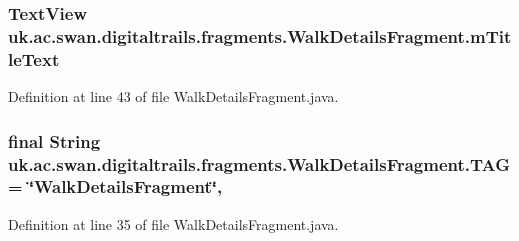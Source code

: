 \hypertarget{classuk_1_1ac_1_1swan_1_1digitaltrails_1_1fragments_1_1_walk_details_fragment_a9413fe91d82c12dd82f7d09040e6363e}{
\subsubsection[{m\+Title\+Text}]{\setlength{\rightskip}{0pt plus 5cm}Text\+View uk.\+ac.\+swan.\+digitaltrails.\+fragments.\+Walk\+Details\+Fragment.\+m\+Title\+Text\hspace{0.3cm}{\ttfamily [protected]}}}\label{classuk_1_1ac_1_1swan_1_1digitaltrails_1_1fragments_1_1_walk_details_fragment_a9413fe91d82c12dd82f7d09040e6363e}


Definition at line 43 of file Walk\+Details\+Fragment.\+java.

\hypertarget{classuk_1_1ac_1_1swan_1_1digitaltrails_1_1fragments_1_1_walk_details_fragment_a2c0b3b3d66868ccd12261377290ee23a}{
\subsubsection[{T\+A\+G}]{\setlength{\rightskip}{0pt plus 5cm}final String uk.\+ac.\+swan.\+digitaltrails.\+fragments.\+Walk\+Details\+Fragment.\+T\+A\+G = \char`\"{}Walk\+Details\+Fragment\char`\"{}\hspace{0.3cm}{\ttfamily [static]}, {\ttfamily [private]}}}\label{classuk_1_1ac_1_1swan_1_1digitaltrails_1_1fragments_1_1_walk_details_fragment_a2c0b3b3d66868ccd12261377290ee23a}


Definition at line 35 of file Walk\+Details\+Fragment.\+java.

